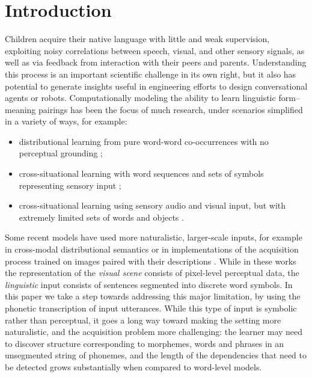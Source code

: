 \section{Introduction}
\label{sec:intro}
Children acquire their native language with little and weak
supervision, exploiting noisy correlations between speech, visual, and
other sensory signals, as well as via feedback from interaction with
their peers and parents. Understanding this process is an important
scientific challenge in its own right, but it also has potential to
generate insights useful in engineering efforts to design
conversational agents or robots. Computationally modeling the ability
to learn linguistic form--meaning pairings has been the focus of much
research, under scenarios simplified in a variety of ways, for
example:

\begin{itemize}
\setlength\itemsep{-0.5em}
\item distributional learning from pure word-word co-occurrences with
  no perceptual grounding \cite{landauer1998introduction,kiros2015skip};
\item cross-situational learning with word sequences and sets of
  symbols representing sensory input
  \cite{siskind.96,fazly.etal.10csj};
\item cross-situational learning using sensory audio and visual
  input, but with extremely limited sets of words and objects
  \cite{Roy2002113,iwahashi2003language}.
\end{itemize}

Some recent models have used more naturalistic, larger-scale inputs,
for example in cross-modal distributional semantics
\cite{lazaridou2015combining} or in implementations of the acquisition
process trained on images paired with their descriptions
\cite{chrupala2015learning}. While in these works the representation
of the {\it visual scene} consists of pixel-level perceptual data, the
{\it linguistic} input consists of sentences segmented into discrete
word symbols. In this paper we take a step towards addressing this
major limitation, by using the phonetic transcription of input
utterances. While this type of input is symbolic rather than
perceptual, it goes a long way toward making the setting more
naturalistic, and the acquisition problem more challenging: the
learner may need to discover structure corresponding to morphemes, words
and phrases in an unsegmented string of phonemes, and the length of
the dependencies that need to be detected grows substantially when
compared to word-level models.

